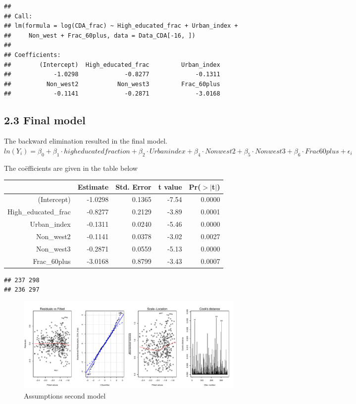 \documentclass[11pt,]{article}
\begin{document}
\begin{verbatim}
## 
## Call:
## lm(formula = log(CDA_frac) ~ High_educated_frac + Urban_index + 
##     Non_west + Frac_60plus, data = Data_CDA[-16, ])
## 
## Coefficients:
##        (Intercept)  High_educated_frac         Urban_index  
##            -1.0298             -0.8277             -0.1311  
##          Non_west2           Non_west3         Frac_60plus  
##            -0.1141             -0.2871             -3.0168
\end{verbatim}

\subsection{2.3 Final model}\label{final-model}

The backward elimination resulted in the final model.\\
\(ln(Y_i) = \beta_0 + \beta_1 \cdot high educated fraction + \beta_2 \cdot Urban index + \beta_4 \cdot Non west2 + \beta_5 \cdot Non west 3 + \beta_6 \cdot Frac 60plus + \epsilon_i\)

The coëfficients are given in the table below

\begin{table}[ht]
\centering
\begin{tabular}{rrrrr}
  \hline
 & Estimate & Std. Error & t value & Pr($>$$|$t$|$) \\ 
  \hline
(Intercept) & -1.0298 & 0.1365 & -7.54 & 0.0000 \\ 
  High\_educated\_frac & -0.8277 & 0.2129 & -3.89 & 0.0001 \\ 
  Urban\_index & -0.1311 & 0.0240 & -5.46 & 0.0000 \\ 
  Non\_west2 & -0.1141 & 0.0378 & -3.02 & 0.0027 \\ 
  Non\_west3 & -0.2871 & 0.0559 & -5.13 & 0.0000 \\ 
  Frac\_60plus & -3.0168 & 0.8799 & -3.43 & 0.0007 \\ 
   \hline
\end{tabular}
\end{table}

\begin{verbatim}
## 237 298 
## 236 297
\end{verbatim}

\begin{figure}[H]

{\centering \includegraphics{Report_files/figure-latex/unnamed-chunk-12-1} 

}

\caption{\label{asm2}Assumptions second model}\label{fig:unnamed-chunk-12}
\end{figure}
\end{document}
